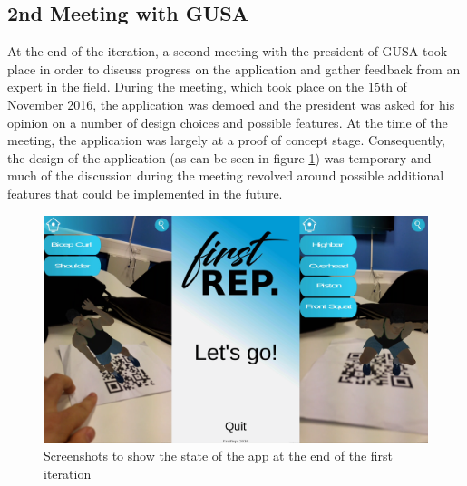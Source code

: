 \documentclass{l4proj}
\begin{document}
\subsection{2nd Meeting with GUSA}
At the end of the iteration, a second meeting with the president of GUSA took place in order to discuss progress on the application and gather feedback from an expert in the field. During the meeting, which took place on the 15th of November 2016, the application was demoed and the president was asked for his opinion on a number of design choices and possible features. At the time of the meeting, the application was largely at a proof of concept stage. Consequently, the design of the application (as can be seen in figure \ref{fig:it1}) was temporary and much of the discussion during the meeting revolved around possible additional features that could be implemented in the future. 

\begin{figure}[h]
\centering
\includegraphics[width=\textwidth]{images/iteration1_screenshots.png}
\caption{Screenshots to show the state of the app at the end of the first iteration}
\label{fig:it1}
\end{figure}
\end{document}
